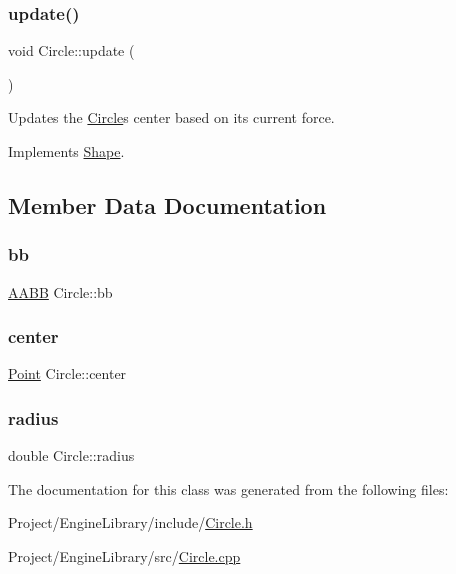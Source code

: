 \mbox{\label{class_circle_aa978eeba0712d29dfae842733bf6c2c7}} 
\subsubsection{\texorpdfstring{update()}{update()}}
{\footnotesize\ttfamily void Circle\+::update (\begin{DoxyParamCaption}{ }\end{DoxyParamCaption})\hspace{0.3cm}{\ttfamily [virtual]}}



Updates the \mbox{\hyperlink{class_circle}{Circle}}\textquotesingle{}s center based on its current force. 



Implements \mbox{\hyperlink{class_shape_a303c47b13b9339dc021e040bbba72651}{Shape}}.



\subsection{Member Data Documentation}
\mbox{\label{class_circle_a41d311e1f5e7001277e61ebe6560f523}} 
\subsubsection{\texorpdfstring{bb}{bb}}
{\footnotesize\ttfamily \mbox{\hyperlink{class_a_a_b_b}{A\+A\+BB}} Circle\+::bb}

\mbox{\label{class_circle_a8c4026a5a34d2df1527f019dd456317b}} 
\subsubsection{\texorpdfstring{center}{center}}
{\footnotesize\ttfamily \mbox{\hyperlink{class_point}{Point}} Circle\+::center}

\mbox{\label{class_circle_a5a0212ba705f57d762bd6b202e3d10ed}} 
\subsubsection{\texorpdfstring{radius}{radius}}
{\footnotesize\ttfamily double Circle\+::radius}



The documentation for this class was generated from the following files\+:\begin{DoxyCompactItemize}
\item 
Project/\+Engine\+Library/include/\mbox{\hyperlink{_circle_8h}{Circle.\+h}}\item 
Project/\+Engine\+Library/src/\mbox{\hyperlink{_circle_8cpp}{Circle.\+cpp}}\end{DoxyCompactItemize}
